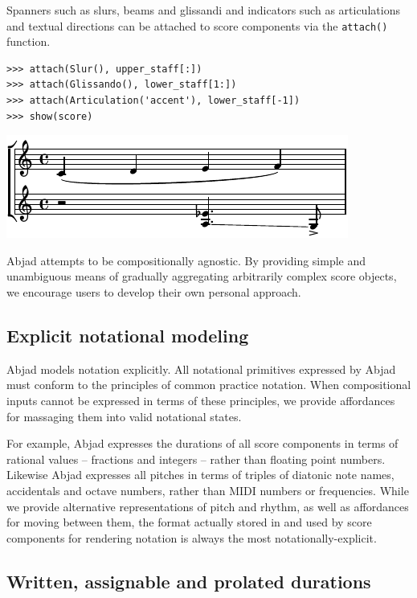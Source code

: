Spanners such as slurs, beams and glissandi and indicators such as
articulations and textual directions can be attached to score components via
the \texttt{attach()} function.

\begin{lstlisting}
>>> attach(Slur(), upper_staff[:])
>>> attach(Glissando(), lower_staff[1:])
>>> attach(Articulation('accent'), lower_staff[-1])
>>> show(score)
\end{lstlisting}

\includegraphics[scale=1.0]{images/section_2_notational_isomorphism-2.pdf}


Abjad attempts to be compositionally agnostic. By providing simple and
unambiguous means of gradually aggregating arbitrarily complex score objects,
we encourage users to develop their own personal approach.

\subsection{Explicit notational modeling}

Abjad models notation explicitly. All notational primitives expressed by Abjad
must conform to the principles of common practice notation. When compositional
inputs cannot be expressed in terms of these principles, we provide affordances
for massaging them into valid notational states.

For example, Abjad expresses the durations of all score components in terms of
rational values -- fractions and integers -- rather than floating point
numbers. Likewise Abjad expresses all pitches in terms of triples of diatonic
note names, accidentals and octave numbers, rather than MIDI numbers or
frequencies. While we provide alternative representations of pitch and rhythm,
as well as affordances for moving between them, the format actually stored in
and used by score components for rendering notation is always the most
notationally-explicit.

\subsection{Written, assignable and prolated durations}


